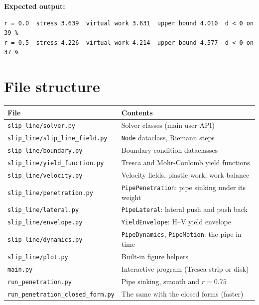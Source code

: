 \documentclass[11pt,a4paper]{article}
\begin{document}
\textbf{Expected output:}
\begin{lstlisting}[numbers=none]
r = 0.0  stress 3.639  virtual work 3.631  upper bound 4.010  d < 0 on 39 %
r = 0.5  stress 4.226  virtual work 4.214  upper bound 4.577  d < 0 on 37 %
\end{lstlisting}

\section{File structure}
\label{sec:files}

\begin{center}
\setlength{\tabcolsep}{4pt}
\begin{tabular}{ll}
\toprule
File & Contents \\
\midrule
\texttt{slip\_line/solver.py}           & Solver classes (main user API) \\
\texttt{slip\_line/slip\_line\_field.py} & \texttt{Node} dataclass, Riemann steps \\
\texttt{slip\_line/boundary.py}         & Boundary-condition dataclasses \\
\texttt{slip\_line/yield\_function.py}  & Tresca and Mohr-Coulomb yield functions \\
\texttt{slip\_line/velocity.py}         & Velocity fields, plastic work, work balance \\
\texttt{slip\_line/penetration.py}      & \texttt{PipePenetration}: pipe sinking under its weight \\
\texttt{slip\_line/lateral.py}          & \texttt{PipeLateral}: lateral push and push back \\
\texttt{slip\_line/envelope.py}         & \texttt{YieldEnvelope}: H--V yield envelope \\
\texttt{slip\_line/dynamics.py}         & \texttt{PipeDynamics}, \texttt{PipeMotion}: the pipe in time \\
\texttt{slip\_line/plot.py}             & Built-in figure helpers \\
\midrule
\texttt{main.py}                       & Interactive program (Tresca strip or disk) \\
\texttt{run\_penetration.py}           & Pipe sinking, smooth and $r = 0.75$ \\
\texttt{run\_penetration\_closed\_form.py} & The same with the closed forms (faster) \\

\end{tabular}
\end{center}
\end{document}
